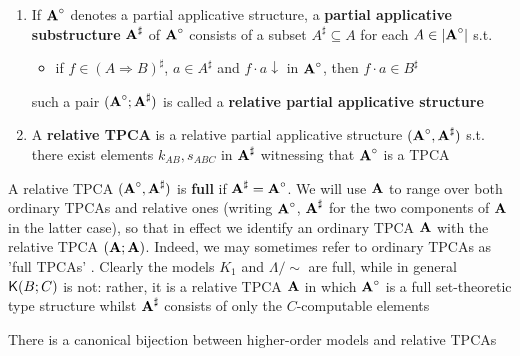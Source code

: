 \documentclass[11pt]{article}
\begin{document}
\begin{definition}[]


\begin{enumerate}
\item If \(\operatorname{\textbf{A}}^\circ\) denotes a partial applicative structure, a \textbf{partial applicative
substructure} \(\operatorname{\textbf{A}}^\sharp\) of \(\operatorname{\textbf{A}}^\circ\) consists of a subset \(A^\sharp\subseteq A\) for each \(A\in\abs{\bA^\circ}\) s.t.
\begin{itemize}
\item if \(f\in(A\Rightarrow B)^\sharp\), \(a\in A^\sharp\) and \(f\cdot a\downarrow\) in \(\operatorname{\textbf{A}}^\circ\), then \(f\cdot a\in B^\sharp\)
\end{itemize}

such a pair \((\operatorname{\textbf{A}}^\circ;\operatorname{\textbf{A}}^\sharp)\) is called a \textbf{relative partial applicative structure}

\item A \textbf{relative TPCA} is a relative partial applicative structure \((\operatorname{\textbf{A}}^\circ,\operatorname{\textbf{A}}^\sharp)\) s.t. there exist
elements \(k_{AB}, s_{ABC}\) in \(\operatorname{\textbf{A}}^\sharp\) witnessing that \(\operatorname{\textbf{A}}^\circ\) is a TPCA
\end{enumerate}
\end{definition}

A relative TPCA \((\operatorname{\textbf{A}}^\circ,\operatorname{\textbf{A}}^\sharp)\) is \textbf{full} if \(\operatorname{\textbf{A}}^\sharp=\operatorname{\textbf{A}}^\circ\). We will use \(\operatorname{\textbf{A}}\) to range over both
ordinary TPCAs and relative ones (writing \(\operatorname{\textbf{A}}^\circ\), \(\operatorname{\textbf{A}}^\sharp\) for the two components of \(\operatorname{\textbf{A}}\) in
the latter case), so that in effect we identify an ordinary TPCA \(\operatorname{\textbf{A}}\) with the relative
TPCA \((\operatorname{\textbf{A}};\operatorname{\textbf{A}})\). Indeed, we may sometimes refer to ordinary TPCAs as 'full TPCAs' . Clearly the
models \(K_1\) and \(\Lambda/\sim\) are full, while in general \(\textsf{K}(B;C)\) is not: rather, it is a
relative TPCA \(\operatorname{\textbf{A}}\) in which \(\operatorname{\textbf{A}}^\circ\) is a full set-theoretic type structure whilst \(\operatorname{\textbf{A}}^\sharp\)
consists of only the \(C\)-computable elements

\begin{theorem}[]
\label{3.1.18}
There is a canonical bijection between higher-order models and relative TPCAs
\end{theorem}
\end{document}
